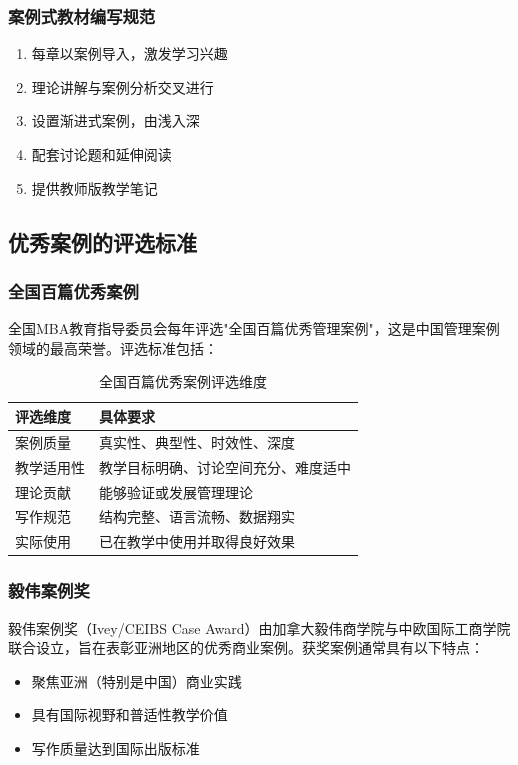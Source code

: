 \documentclass[12pt,a4paper]{ctexart}
\begin{document}
\subsubsection{案例式教材编写规范}

\begin{keypoint}[案例式教材编写要点]
\begin{enumerate}[leftmargin=2em]
    \item 每章以案例导入，激发学习兴趣
    \item 理论讲解与案例分析交叉进行
    \item 设置渐进式案例，由浅入深
    \item 配套讨论题和延伸阅读
    \item 提供教师版教学笔记
\end{enumerate}
\end{keypoint}

\subsection{优秀案例的评选标准}

\subsubsection{全国百篇优秀案例}

全国MBA教育指导委员会每年评选"全国百篇优秀管理案例"，这是中国管理案例领域的最高荣誉。评选标准包括：

\begin{table}[htbp]
\centering
\caption{全国百篇优秀案例评选维度}
\begin{tabular}{p{3cm}p{8cm}}
\toprule
\textbf{评选维度} & \textbf{具体要求} \\
\midrule
案例质量 & 真实性、典型性、时效性、深度 \\
教学适用性 & 教学目标明确、讨论空间充分、难度适中 \\
理论贡献 & 能够验证或发展管理理论 \\
写作规范 & 结构完整、语言流畅、数据翔实 \\
实际使用 & 已在教学中使用并取得良好效果 \\
\bottomrule
\end{tabular}
\end{table}

\subsubsection{毅伟案例奖}

毅伟案例奖（Ivey/CEIBS Case Award）由加拿大毅伟商学院与中欧国际工商学院联合设立，旨在表彰亚洲地区的优秀商业案例。获奖案例通常具有以下特点：
\begin{itemize}[leftmargin=2em]
    \item 聚焦亚洲（特别是中国）商业实践
    \item 具有国际视野和普适性教学价值
    \item 写作质量达到国际出版标准
\end{itemize}
\end{document}
